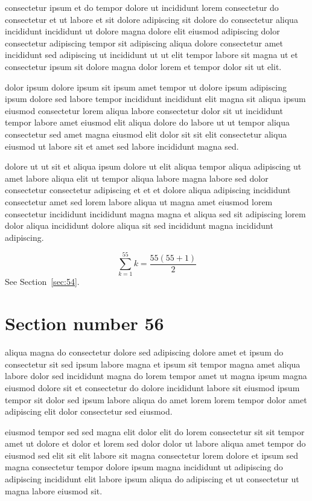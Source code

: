 \documentclass{article}
\begin{document}
consectetur ipsum et do tempor dolore ut incididunt lorem consectetur do consectetur et ut labore et sit dolore adipiscing sit dolore do consectetur aliqua incididunt incididunt ut dolore magna dolore elit eiusmod adipiscing dolor consectetur adipiscing tempor sit adipiscing aliqua dolore consectetur amet incididunt sed adipiscing ut incididunt ut ut elit tempor labore sit magna ut et consectetur ipsum sit dolore magna dolor lorem et tempor dolor sit ut elit.

dolor ipsum dolore ipsum sit ipsum amet tempor ut dolore ipsum adipiscing ipsum dolore sed labore tempor incididunt incididunt elit magna sit aliqua ipsum eiusmod consectetur lorem aliqua labore consectetur dolor sit ut incididunt tempor labore amet eiusmod elit aliqua dolore do labore ut ut tempor aliqua consectetur sed amet magna eiusmod elit dolor sit sit elit consectetur aliqua eiusmod ut labore sit et amet sed labore incididunt magna sed.

dolore ut ut sit et aliqua ipsum dolore ut elit aliqua tempor aliqua adipiscing ut amet labore aliqua elit ut tempor aliqua labore magna labore sed dolor consectetur consectetur adipiscing et et et dolore aliqua adipiscing incididunt consectetur amet sed lorem labore aliqua ut magna amet eiusmod lorem consectetur incididunt incididunt magna magna et aliqua sed sit adipiscing lorem dolor aliqua incididunt dolore aliqua sit sed incididunt magna incididunt adipiscing.

\begin{equation} \sum_{k=1}^{55} k = \frac{55(55+1)}{2} \end{equation}
See Section~\ref{sec:54}.

\section{Section number 56}\label{sec:56}
aliqua magna do consectetur dolore sed adipiscing dolore amet et ipsum do consectetur sit sed ipsum labore magna et ipsum sit tempor magna amet aliqua labore dolor sed incididunt magna do lorem tempor amet ut magna ipsum magna eiusmod dolore sit et consectetur do dolore incididunt labore sit eiusmod ipsum tempor sit dolor sed ipsum labore aliqua do amet lorem lorem tempor dolor amet adipiscing elit dolor consectetur sed eiusmod.

eiusmod tempor sed sed magna elit dolor elit do lorem consectetur sit sit tempor amet ut dolore et dolor et lorem sed dolor dolor ut labore aliqua amet tempor do eiusmod sed elit sit elit labore sit magna consectetur lorem dolore et ipsum sed magna consectetur tempor dolore ipsum magna incididunt ut adipiscing do adipiscing incididunt elit labore ipsum aliqua do adipiscing et ut consectetur ut magna labore eiusmod sit.
\end{document}
